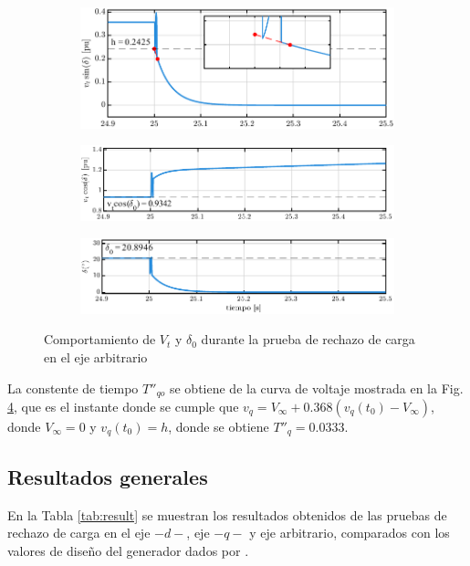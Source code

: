 \documentclass[conference]{IEEEtran}
\begin{document}
\begin{figure}[ht]
    \centering
    \begin{subfigure}
        \centering
        \includegraphics[width=\linewidth]{Fig/fig6.pdf}
        \label{fig:fig6}
    \end{subfigure}
    \hfill
    \begin{subfigure}
        \centering
        \includegraphics[width=\linewidth]{Fig/fig7.pdf}
        \label{fig:fig7}
    \end{subfigure}
    \hfill
    \begin{subfigure}
        \centering
        \includegraphics[width=\linewidth]{Fig/fig8.pdf}    
        \label{fig:fig8}
    \end{subfigure}
    \caption{Comportamiento de $V_t$ y $\delta_0$ durante la prueba de rechazo de carga en el eje arbitrario}
    \label{fig:subfigs1}
\end{figure}

La constente de tiempo $T''_{qo}$ se obtiene de la curva de voltaje mostrada en la Fig. \ref{fig:subfigs1}, que es el instante donde se 
cumple que $v_q = V_{\infty} + 0.368(v_q(t_0)-V_\infty)$, donde $V_\infty = 0$ y $v_q(t_0) = h$, donde se obtiene $T''_q = 0.0333$.

\subsection{Resultados generales}
En la Tabla \ref{tab:result} se muestran los resultados obtenidos de las pruebas de rechazo de carga en el eje $-d-$, eje $-q-$ y eje arbitrario, comparados con los valores de diseño del generador dados por \cite{pequena}.
\end{document}
